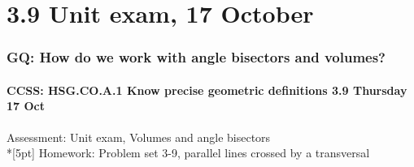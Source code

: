 \documentclass{beamer}
\begin{document}
\section{3.9 Unit exam, 17 October}
    \frame
    {
      \frametitle{GQ: How do we work with angle bisectors and volumes?}
      \framesubtitle{CCSS: HSG.CO.A.1 Know precise geometric definitions \hfill \alert{3.9 Thursday 17 Oct}}

      Assessment: Unit exam, Volumes and angle bisectors\\*[5pt]
      Homework: Problem set 3-9, parallel lines crossed by a transversal
    }
\end{document}
